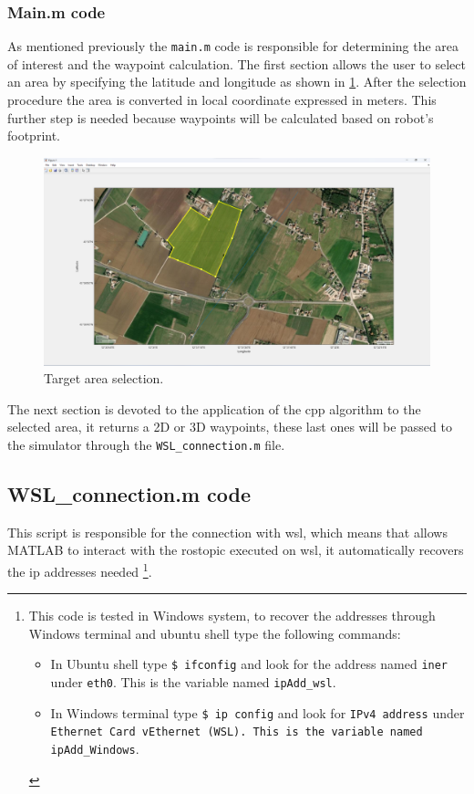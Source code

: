 \subsubsection*{Main.m code}
As mentioned previously the \texttt{main.m} code is responsible for determining the area of interest and the waypoint calculation.
The first section allows the user to select an area by specifying the latitude and longitude as shown in \ref{fig:target_area_selection}. After the selection procedure the area is converted in local coordinate expressed in meters. This further step is needed because waypoints will be calculated based on robot's footprint.

\begin{figure}[hbt!]
	\centering
	\includegraphics[width=\linewidth]{images/target_area_selection}
	\caption{Target area selection.}
	\label{fig:target_area_selection}
\end{figure}

The next section is devoted to the application of the \ac{cpp} algorithm to the selected area, it returns a 2D or 3D waypoints, these last ones will be passed to the simulator through the \texttt{WSL\_connection.m} file.


\subsection{WSL\_connection.m code}
This script is responsible for the connection with \ac{wsl}, which means that allows MATLAB to interact with the rostopic executed on \ac{wsl}, it automatically recovers the ip addresses needed
\footnote{This code is tested in Windows system, to recover the addresses through Windows terminal and ubuntu shell type the following commands: 
\begin{itemize}
	\item In Ubuntu shell type \texttt{\$ ifconfig} and look for the address named \texttt{iner} under \texttt{eth0}. This is the variable named \texttt{ipAdd\_wsl}.
	\item In Windows terminal type \texttt{\$ ip config} and look for \texttt{IPv4 address} under \texttt{Ethernet Card vEthernet (WSL). This is the variable named \texttt{ipAdd\_Windows}}.
\end{itemize}}.


